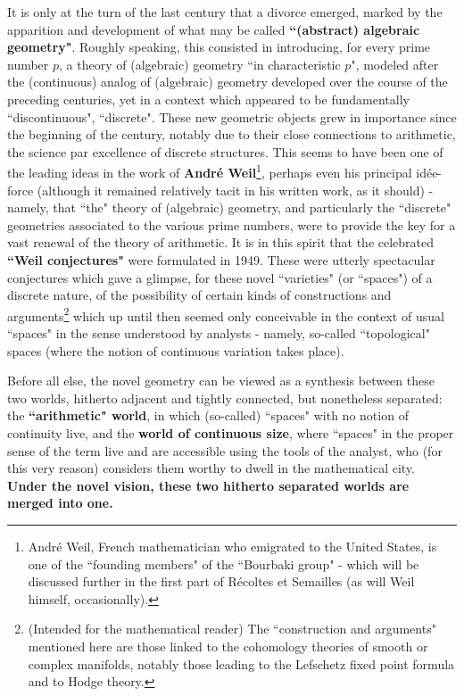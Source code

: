 It is only at the turn of the last century that a divorce emerged, marked by the apparition and development of what may be called \textbf{``(abstract) algebraic geometry"}. Roughly speaking, this consisted in introducing, for every prime number $p$, a theory of (algebraic) geometry ``in characteristic $p$", modeled after the (continuous) analog of (algebraic) geometry developed over the course of the preceding centuries, yet in a context which appeared to be fundamentally ``discontinuous", ``discrete". These new geometric objects grew in importance since the beginning of the century, notably due to their close connections to arithmetic, the science par excellence of discrete structures. This seems to have been one of the leading ideas in the work of \textbf{Andr\'e Weil}\footnote{Andr\'e Weil, French mathematician who emigrated to the United States, is one of the ``founding members" of the ``Bourbaki group" - which will be discussed further in the first part of R\'ecoltes et Semailles (as will Weil himself, occasionally).}, perhaps even his principal id\'ee-force (although it remained relatively tacit in his written work, as it should) - namely, that ``the" theory of (algebraic) geometry, and particularly the ``discrete" geometries associated to the various prime numbers, were to provide the key for a vast renewal of the theory of arithmetic. It is in this spirit that the celebrated \textbf{``Weil conjectures"} were formulated in 1949. These were utterly spectacular conjectures which gave a glimpse, for these novel ``varieties" (or ``spaces") of a discrete nature, of the possibility of certain kinds of constructions and arguments\footnote{(Intended for the mathematical reader) The ``construction and arguments" mentioned here are those linked to the cohomology theories of smooth or complex manifolds, notably those leading to the Lefschetz fixed point formula and to Hodge theory.} which up until then seemed only conceivable in the context of usual ``spaces" in the sense understood by analysts - namely, so-called ``topological" spaces (where the notion of continuous variation takes place). 

Before all else, the novel geometry can be viewed as a synthesis between these two worlds, hitherto adjacent and tightly connected, but nonetheless separated: the \textbf{``arithmetic" world}, in which (so-called) ``spaces" with no notion of continuity live, and the \textbf{world of continuous size}, where ``spaces" in the proper sense of the term live and are accessible using the tools of the analyst, who (for this very reason) considers them worthy to dwell in the mathematical city. \textbf{Under the novel vision, these two hitherto separated worlds are merged into one.}

